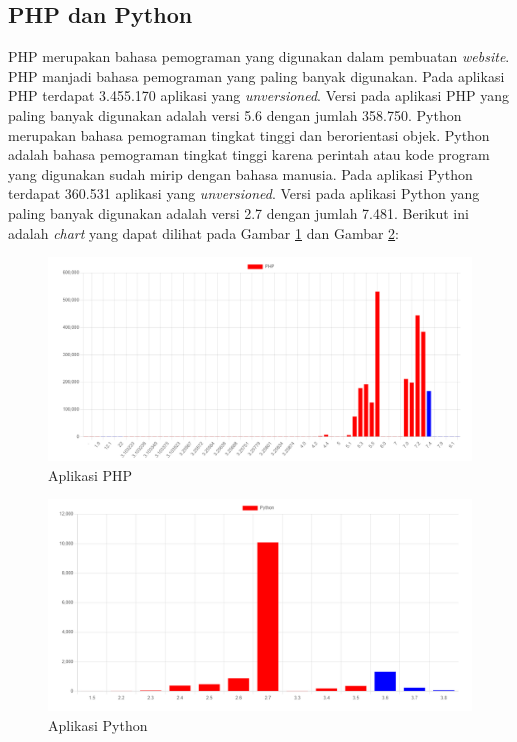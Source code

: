 \subsection{PHP dan Python}
PHP merupakan bahasa pemograman yang digunakan dalam pembuatan \textit{website}. PHP manjadi bahasa pemograman yang paling banyak digunakan. Pada aplikasi PHP terdapat 3.455.170 aplikasi yang \textit{unversioned}. Versi pada aplikasi PHP yang paling banyak digunakan adalah versi 5.6 dengan jumlah 358.750.
Python merupakan bahasa pemograman tingkat tinggi dan berorientasi objek. Python adalah bahasa pemograman tingkat tinggi karena perintah atau kode program yang digunakan sudah mirip dengan bahasa manusia. Pada aplikasi Python terdapat 360.531 aplikasi yang \textit{unversioned}. Versi pada aplikasi Python yang paling banyak digunakan adalah versi 2.7 dengan jumlah 7.481. Berikut ini adalah \textit{chart} yang dapat dilihat pada Gambar \ref{fig:data_sample_php} dan Gambar \ref{fig:data_sample_python}:
\begin{figure}[H]
	\centering  
	\includegraphics[scale=0.7]{Gambar/data_sample_php.png}  
	\caption{Aplikasi PHP} 
	\label{fig:data_sample_php} 
\end{figure}

\begin{figure}[H]
	\centering  
	\includegraphics[scale=0.7]{Gambar/data_sample_python.png}  
	\caption{Aplikasi Python} 
	\label{fig:data_sample_python} 
\end{figure}

